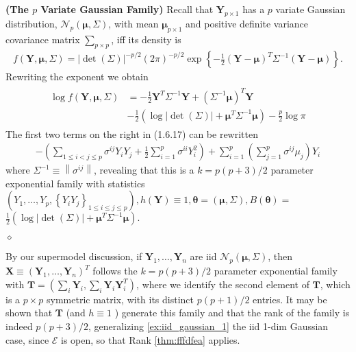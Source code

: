 \documentclass{article}
\newcommand{\bfs}[1]{\textbf{({#1}) }}
\begin{document}
\begin{exma}\bfs{The $p$ Variate Gaussian Family}
  Recall that $\mathbf{Y}_{p \times 1}$ has a $p$ variate Gaussian distribution, $\mathcal{N}_{p}(\boldsymbol{\mu}, \Sigma)$, with mean $\boldsymbol{\mu}_{p \times 1}$ and positive definite variance covariance matrix $\sum_{p \times p}$, iff its density is
\begin{align*}
f(\mathbf{Y}, \boldsymbol{\mu}, \Sigma)=|\operatorname{det}(\Sigma)|^{-p / 2}(2 \pi)^{-p / 2} \exp \left\{-\frac{1}{2}(\mathbf{Y}-\boldsymbol{\mu})^{T} \Sigma^{-1}(\mathbf{Y}-\boldsymbol{\mu})\right\} .
\end{align*}
Rewriting the exponent we obtain
\begin{align*}
\begin{aligned}
\log f(\mathbf{Y}, \boldsymbol{\mu}, \Sigma) &=-\frac{1}{2} \mathbf{Y}^{T} \Sigma^{-1} \mathbf{Y}+\left(\Sigma^{-1} \boldsymbol{\mu}\right)^{T} \mathbf{Y} \\
&-\frac{1}{2}\left(\log |\operatorname{det}(\Sigma)|+\boldsymbol{\mu}^{T} \Sigma^{-1} \boldsymbol{\mu}\right)-\frac{p}{2} \log \pi
\end{aligned}
\end{align*}
The first two terms on the right in (1.6.17) can be rewritten
\begin{align*}
-\left(\sum_{1 \leq i<j \leq p} \sigma^{i j} Y_{i} Y_{j}+\frac{1}{2} \sum_{i=1}^{p} \sigma^{i i} Y_{i}^{2}\right)+\sum_{i=1}^{p}\left(\sum_{j=1}^{p} \sigma^{i j} \mu_{j}\right) Y_{i}
\end{align*}
where $\Sigma^{-1} \equiv\left\|\sigma^{i j}\right\|$, revealing that this is a $k=p(p+3) / 2$ parameter exponential family with statistics $\left(Y_{1}, \ldots, Y_{p},\left\{Y_{i} Y_{j}\right\}_{1 \leq i \leq j \leq p}\right), h(\mathbf{Y}) \equiv 1, \boldsymbol{\theta}=(\boldsymbol{\mu}, \Sigma), B(\boldsymbol{\theta})=$ $\frac{1}{2}\left(\log |\operatorname{det}(\Sigma)|+\boldsymbol{\mu}^{T} \Sigma^{-1} \boldsymbol{\mu}\right) .$ 

$\diamond$ 

By our supermodel discussion, if $\mathbf{Y}_{1}, \ldots, \mathbf{Y}_{n}$ are iid $\mathcal{N}_{p}(\boldsymbol{\mu}, \Sigma)$, then $\mathbf{X} \equiv\left(\mathbf{Y}_{1}, \ldots, \mathbf{Y}_{n}\right)^{T}$ follows the $k=p(p+3) / 2$ parameter exponential family with $\mathbf{T}=\left(\sum_{i} \mathbf{Y}_{i}, \sum_{i} \mathbf{Y}_{i} \mathbf{Y}_{i}^{T}\right)$, where we identify the second element of $\mathbf{T}$, which is a $p \times p$ symmetric matrix, with its distinct $p(p+1) / 2$ entries. It may be shown that $\mathbf{T}$ (and $h \equiv 1$ ) generate this family and that the rank of the family is indeed $p(p+3) / 2$, generalizing \cref{ex:iid_gaussian_1} the \gls{iid} 1-dim Gaussian case, since $\mathcal{E}$ is open, so that Rank \cref{thm:fffdfea} applies.
\end{exma}
\end{document}
